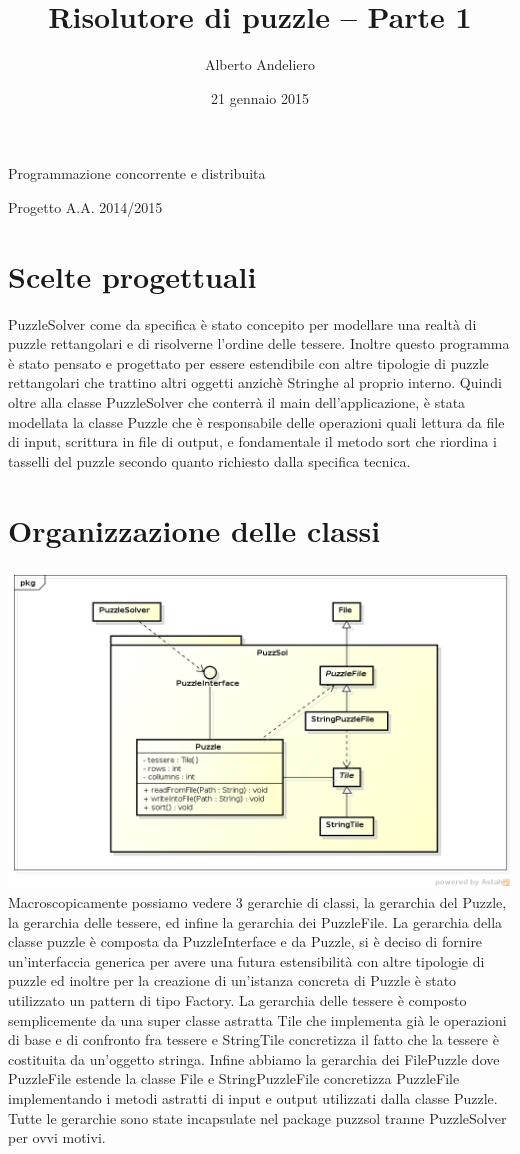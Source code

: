 \documentclass[a4paper]{article}
\title{Risolutore di puzzle – Parte 1}
\author{Alberto Andeliero}
\date{21 gennaio 2015}
\begin{document}
\maketitle
\centerline{Programmazione concorrente e distribuita}
\centerline{Progetto A.A. 2014/2015}
\section{Scelte progettuali}
PuzzleSolver come da specifica è stato concepito per modellare una realtà di puzzle rettangolari e di risolverne l'ordine delle tessere. Inoltre questo programma è stato pensato e progettato per essere estendibile con altre tipologie di puzzle rettangolari che trattino altri oggetti anzichè Stringhe al proprio interno. Quindi oltre alla classe PuzzleSolver che conterrà il main dell'applicazione, è stata modellata la classe Puzzle che è responsabile delle operazioni quali lettura da file di input, scrittura in file di output, e fondamentale il metodo sort che riordina i tasselli del puzzle secondo quanto richiesto dalla specifica tecnica.

\section{Organizzazione delle classi}
\includegraphics[width=\textwidth]{classdiagram.png}
Macroscopicamente possiamo vedere 3 gerarchie di classi, la gerarchia del Puzzle, la gerarchia delle tessere, ed infine la gerarchia dei PuzzleFile. La gerarchia della classe puzzle è composta da PuzzleInterface e da Puzzle, si è deciso di fornire un'interfaccia generica per avere una futura estensibilità con altre tipologie di puzzle ed inoltre per la creazione di un'istanza concreta di Puzzle è stato utilizzato un pattern di tipo Factory. La gerarchia delle tessere è composto semplicemente da una super classe astratta Tile che implementa già le operazioni di base e di confronto fra tessere e StringTile concretizza il fatto che la tessere è costituita da un'oggetto stringa. Infine abbiamo la gerarchia dei FilePuzzle dove PuzzleFile estende la classe File e StringPuzzleFile concretizza PuzzleFile implementando i metodi astratti di input e output utilizzati dalla classe Puzzle. Tutte le gerarchie sono state incapsulate nel package puzzsol tranne PuzzleSolver per ovvi motivi.
\end{document}
